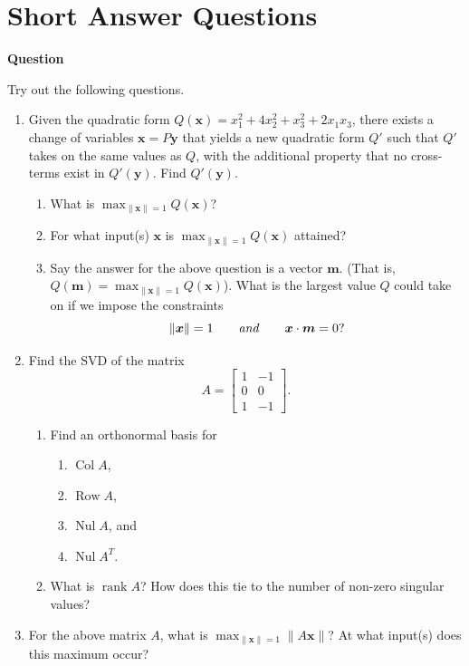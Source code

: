 \documentclass[10pt, titlepage]{article}
\newcounter{question}
\newenvironment{newquestion}
{
	\noindent\textbf{Question \thequestion}
}
{
\stepcounter{question}
\par
}
\renewcommand{\vec}[1]{\bm{#1}}
\DeclareMathOperator{\colspace}{Col}
\DeclareMathOperator{\rowspace}{Row}
\DeclareMathOperator{\nullspace}{Nul}
\DeclareMathOperator{\rank}{rank}
\begin{document}
\section{\centering Short Answer Questions}
	\begin{newquestion}
		Try out the following questions.
		\begin{enumerate}
			\item Given the quadratic form \(Q(\vec{x}) = x_1^2 + 4x_2^2 + x_3^2 + 2x_1x_3\), there exists a change of variables \(\vec{x} = P\vec{y}\)
				that yields a new quadratic form \(Q'\) such that \(Q'\) takes on the same values as \(Q\), with the additional property that no cross-terms
				exist in \(Q'(\vec{y})\). Find \(Q'(\vec{y})\).
				\begin{enumerate}
					\item What is \(\max_{\|\vec{x}\|  = 1} Q(\vec{x})\)?
					\item For what input(s) \(\vec{x}\) is \(\max_{\|\vec{x}\| = 1} Q(\vec{x})\) attained?
					\item Say the answer for the above question is a vector \(\vec{m}\). (That is, \(Q(\vec{m}) = \max_{\|\vec{x}\| = 1} Q(\vec{x})\)). What is the largest value \(Q\) could take on if we impose the 
						constraints \[\|\vec{x}\| = 1 \qquad \text{\emph{and}} \qquad \vec{x} \cdot \vec{m} = 0?\]
				\end{enumerate}
			 
			\item Find the SVD of the matrix \[A = \begin{bmatrix}1 & -1 \\ 0 & 0 \\ 1 & -1\end{bmatrix}.\]
				\begin{enumerate}
					\item Find an orthonormal basis for 
						\begin{enumerate}
							\item \(\colspace A\), 
							\item \(\rowspace A\), 
							\item \(\nullspace A\), and 
							\item \(\nullspace A^T\).
						\end{enumerate}
					\item What is \(\rank A\)? How does this tie to the number of non-zero singular values?
				\end{enumerate}
			\item For the above matrix \(A\), what is \(\max_{\|\vec{x}\| = 1} \|A\vec{x}\|\)? At what input(s) does this maximum occur?
		\end{enumerate} 
	\end{newquestion}


\end{document}

